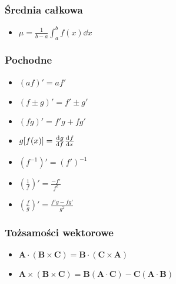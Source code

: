 \documentclass[../main.tex]{subfiles}
\begin{document}
\begin{multicols}{2}
\subsubsection*{Średnia całkowa}
\begin{itemize}
    \item \(\mu=\frac{1}{b-a}\int_a^bf(x)\dd{x}\)
\end{itemize}
\subsubsection*{Pochodne}
\begin{itemize}
    \item \((af)'=af'\)
    \item \((f\pm g)'=f'\pm g'\)
    \item \((fg)'=f'g+fg'\)
    \item \(g[f(x)]=\dv[]{g}{f}\dv[]{f}{x}\)
    \item \((f^{-1})'=(f')^{-1}\)
    \item \((\frac{1}{f})'=\frac{-f'}{f^2}\)
    \item \((\frac{f}{g})'=\frac{f'g-fg'}{g^2}\)
\end{itemize}
\subsubsection*{Tożsamości wektorowe}
\begin{itemize}
    \item
    \(\mathbf{A}\cdot(\mathbf{B}\times\mathbf{C})=\mathbf{B}\cdot(\mathbf{C}\times\mathbf{A})\)
    \item
    \(\mathbf{A}\times(\mathbf{B}\times\mathbf{C})=\mathbf{B}(\mathbf{A}\cdot\mathbf{C})-\mathbf{C}(\mathbf{A}\cdot\mathbf{B})\)
\end{itemize}

\end{multicols}
\end{document}
